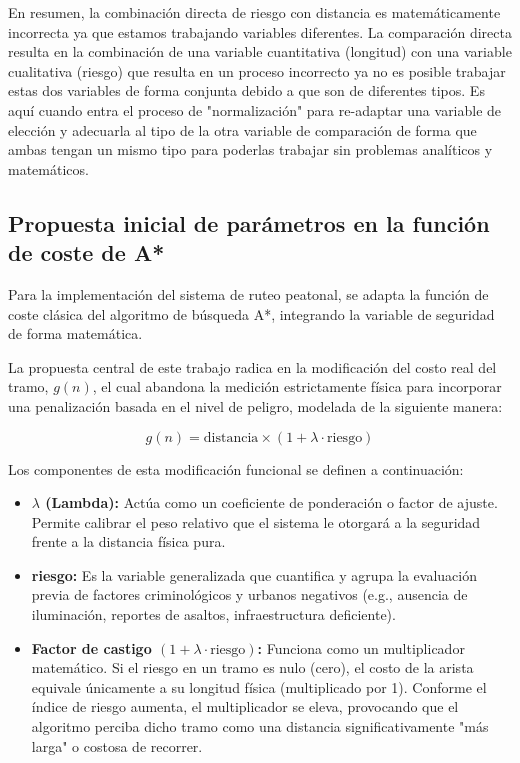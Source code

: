 En resumen, la combinación directa de riesgo con distancia es matemáticamente incorrecta ya que estamos trabajando variables diferentes. La comparación directa resulta en la combinación de una variable cuantitativa (longitud) con una variable cualitativa (riesgo) que resulta en un proceso incorrecto ya no es posible trabajar estas dos variables de forma conjunta debido a que son de diferentes tipos. Es aquí cuando entra el proceso de "normalización" para re-adaptar una variable de elección y adecuarla al tipo de la otra variable de comparación de forma que ambas tengan un mismo tipo para poderlas trabajar sin problemas analíticos y matemáticos.

\subsection{Propuesta inicial de parámetros en la función de coste de A*}

Para la implementación del sistema de ruteo peatonal, se adapta la función de coste clásica del algoritmo de búsqueda A*, integrando la variable de seguridad de forma matemática. 

La propuesta central de este trabajo radica en la modificación del costo real del tramo, $g(n)$, el cual abandona la medición estrictamente física para incorporar una penalización basada en el nivel de peligro, modelada de la siguiente manera:

\begin{equation}
    g(n) = \text{distancia} \times (1 + \lambda \cdot \text{riesgo})
    \label{eq:gn_riesgo}
\end{equation}

Los componentes de esta modificación funcional se definen a continuación:

\begin{itemize}
    \item \textbf{$\lambda$ (Lambda):} Actúa como un coeficiente de ponderación o factor de ajuste. Permite calibrar el peso relativo que el sistema le otorgará a la seguridad frente a la distancia física pura.
    \item \textbf{riesgo:} Es la variable generalizada que cuantifica y agrupa la evaluación previa de factores criminológicos y urbanos negativos (e.g., ausencia de iluminación, reportes de asaltos, infraestructura deficiente).
    \item \textbf{Factor de castigo $(1 + \lambda \cdot \text{riesgo})$:} Funciona como un multiplicador matemático. Si el riesgo en un tramo es nulo (cero), el costo de la arista equivale únicamente a su longitud física (multiplicado por 1). Conforme el índice de riesgo aumenta, el multiplicador se eleva, provocando que el algoritmo perciba dicho tramo como una distancia significativamente "más larga" o costosa de recorrer.
\end{itemize}


